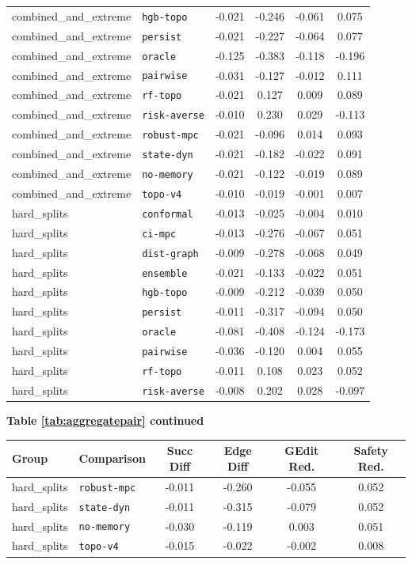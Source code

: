 \documentclass{article}
\begin{document}
\begin{center}
\begin{tabular}{llcccc}
combined\_and\_extreme & \texttt{hgb-topo} & -0.021 & -0.246 & -0.061 & 0.075 \\
combined\_and\_extreme & \texttt{persist} & -0.021 & -0.227 & -0.064 & 0.077 \\
combined\_and\_extreme & \texttt{oracle} & -0.125 & -0.383 & -0.118 & -0.196 \\
combined\_and\_extreme & \texttt{pairwise} & -0.031 & -0.127 & -0.012 & 0.111 \\
combined\_and\_extreme & \texttt{rf-topo} & -0.021 & 0.127 & 0.009 & 0.089 \\
combined\_and\_extreme & \texttt{risk-averse} & -0.010 & 0.230 & 0.029 & -0.113 \\
combined\_and\_extreme & \texttt{robust-mpc} & -0.021 & -0.096 & 0.014 & 0.093 \\
combined\_and\_extreme & \texttt{state-dyn} & -0.021 & -0.182 & -0.022 & 0.091 \\
combined\_and\_extreme & \texttt{no-memory} & -0.021 & -0.122 & -0.019 & 0.089 \\
combined\_and\_extreme & \texttt{topo-v4} & -0.010 & -0.019 & -0.001 & 0.007 \\
hard\_splits & \texttt{conformal} & -0.013 & -0.025 & -0.004 & 0.010 \\
hard\_splits & \texttt{ci-mpc} & -0.013 & -0.276 & -0.067 & 0.051 \\
hard\_splits & \texttt{dist-graph} & -0.009 & -0.278 & -0.068 & 0.049 \\
hard\_splits & \texttt{ensemble} & -0.021 & -0.133 & -0.022 & 0.051 \\
hard\_splits & \texttt{hgb-topo} & -0.009 & -0.212 & -0.039 & 0.050 \\
hard\_splits & \texttt{persist} & -0.011 & -0.317 & -0.094 & 0.050 \\
hard\_splits & \texttt{oracle} & -0.081 & -0.408 & -0.124 & -0.173 \\
hard\_splits & \texttt{pairwise} & -0.036 & -0.120 & 0.004 & 0.055 \\
hard\_splits & \texttt{rf-topo} & -0.011 & 0.108 & 0.023 & 0.052 \\
hard\_splits & \texttt{risk-averse} & -0.008 & 0.202 & 0.028 & -0.097 \\
\bottomrule
\end{tabular}
\end{center}
\begin{center}
\textbf{Table \ref{tab:aggregatepair} continued}\\[0.4ex]
\begin{tabular}{llcccc}
\toprule
Group & Comparison & Succ Diff & Edge Diff & GEdit Red. & Safety Red. \\
\midrule
hard\_splits & \texttt{robust-mpc} & -0.011 & -0.260 & -0.055 & 0.052 \\
hard\_splits & \texttt{state-dyn} & -0.011 & -0.315 & -0.079 & 0.052 \\
hard\_splits & \texttt{no-memory} & -0.030 & -0.119 & 0.003 & 0.051 \\
hard\_splits & \texttt{topo-v4} & -0.015 & -0.022 & -0.002 & 0.008 \\
\bottomrule
\end{tabular}
\end{center}
\end{document}
